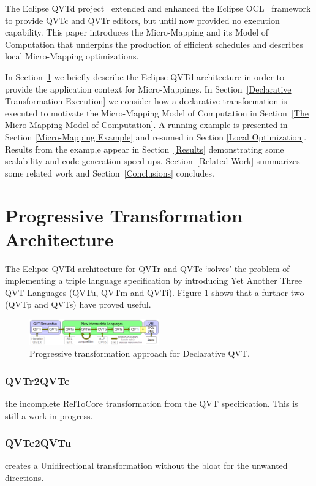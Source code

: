 \documentclass[conference]{IEEEtran}
\begin{document}
The Eclipse QVTd project~\cite{Eclipse-QVTd} extended and enhanced the Eclipse OCL~\cite{Eclipse-OCL} framework to provide QVTc and QVTr editors, but until now provided no execution capability. This paper introduces the Micro-Mapping and its Model of Computation that underpins the production of efficient schedules and describes local Micro-Mapping optimizations.

In Section~\ref{Architecture} we briefly describe the Eclipse QVTd architecture in order to provide the application context for Micro-Mappings. In Section~\ref{Declarative Transformation Execution} we consider how a declarative transformation is executed to motivate the Micro-Mapping Model of Computation in Section~\ref{The Micro-Mapping Model of Computation}. A running example is presented in Section \ref{Micro-Mapping Example} and resumed in Section \ref {Local Optimization}. Results from the examp,e appear in Section~\ref{Results} demonstrating some scalability and code generation speed-ups. Section~\ref{Related Work} summarizes some related work and Section~\ref{Conclusions} concludes.

\section{Progressive Transformation Architecture}\label{Architecture}

The Eclipse QVTd architecture for QVTr and QVTc `solves' the problem of implementing a triple language specification by introducing Yet Another Three QVT Languages\cite{ya3qvt} (QVTu, QVTm and QVTi). Figure \ref{fig:architecture} shows that a further two (QVTp and QVTs) have proved useful.

\begin{figure}[h]
	\centering
	\includegraphics[width=0.5\textwidth]{QVThorizontalAlphabet.png}
	\caption{Progressive transformation approach for Declarative QVT.}
	\label{fig:architecture}
\end{figure}

\subsubsection{QVTr2QVTc} the incomplete RelToCore transformation from the QVT specification. This is still a work in progress.

\subsubsection{QVTc2QVTu} creates a Unidirectional transformation without the bloat for the unwanted directions.
\end{document}
